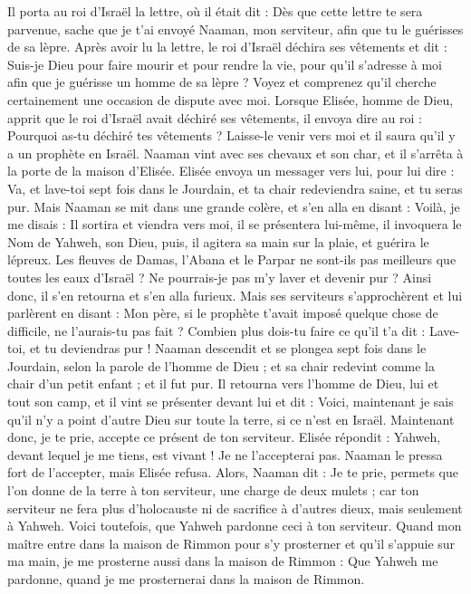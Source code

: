 \begin{multicols}{2}
Il porta au roi d'Israël la lettre, où il était dit : Dès que cette lettre te sera parvenue, sache que je t'ai envoyé Naaman, mon serviteur, afin que tu le guérisses de sa lèpre.
Après avoir lu la lettre, le roi d'Israël déchira ses vêtements et dit : Suis-je Dieu pour faire mourir et pour rendre la vie, pour qu'il s'adresse à moi afin que je guérisse un homme de sa lèpre ? Voyez et comprenez qu'il cherche certainement une occasion de dispute avec moi.
Lorsque Elisée, homme de Dieu, apprit que le roi d'Israël avait déchiré ses vêtements, il envoya dire au roi : Pourquoi as-tu déchiré tes vêtements ? Laisse-le venir vers moi et il saura qu'il y a un prophète en Israël.
Naaman vint avec ses chevaux et son char, et il s'arrêta à la porte de la maison d'Elisée.
Elisée envoya un messager vers lui, pour lui dire : Va, et lave-toi sept fois dans le Jourdain, et ta chair redeviendra saine, et tu seras pur.
Mais Naaman se mit dans une grande colère, et s'en alla en disant : Voilà, je me disais : Il sortira et viendra vers moi, il se présentera lui-même, il invoquera le Nom de Yahweh, son Dieu, puis, il agitera sa main sur la plaie, et guérira le lépreux.
Les fleuves de Damas, l'Abana et le Parpar ne sont-ils pas meilleurs que toutes les eaux d'Israël ? Ne pourrais-je pas m'y laver et devenir pur ? Ainsi donc, il s'en retourna et s'en alla furieux.
Mais ses serviteurs s'approchèrent et lui parlèrent en disant : Mon père, si le prophète t'avait imposé quelque chose de difficile, ne l'aurais-tu pas fait ? Combien plus dois-tu faire ce qu'il t'a dit : Lave-toi, et tu deviendras pur !
Naaman descendit et se plongea sept fois dans le Jourdain, selon la parole de l'homme de Dieu ; et sa chair redevint comme la chair d'un petit enfant ; et il fut pur.
Il retourna vers l'homme de Dieu, lui et tout son camp, et il vint se présenter devant lui et dit : Voici, maintenant je sais qu'il n'y a point d'autre Dieu sur toute la terre, si ce n'est en Israël. Maintenant donc, je te prie, accepte ce présent de ton serviteur.
Elisée répondit : Yahweh, devant lequel je me tiens, est vivant ! Je ne l'accepterai pas. Naaman le pressa fort de l'accepter, mais Elisée refusa.
Alors, Naaman dit : Je te prie, permets que l'on donne de la terre à ton serviteur, une charge de deux mulets ; car ton serviteur ne fera plus d'holocauste ni de sacrifice à d'autres dieux, mais seulement à Yahweh.
Voici toutefois, que Yahweh pardonne ceci à ton serviteur. Quand mon maître entre dans la maison de Rimmon pour s'y prosterner et qu'il s'appuie sur ma main, je me prosterne aussi dans la maison de Rimmon : Que Yahweh me pardonne, quand je me prosternerai dans la maison de Rimmon.

\end{multicols}

